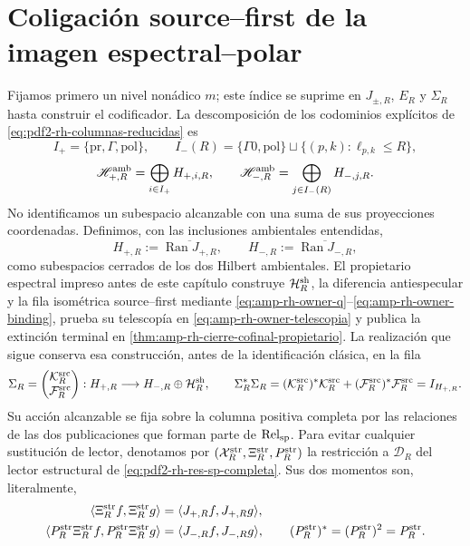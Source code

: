 \section{Coligación source--first de la imagen espectral--polar}

Fijamos primero un nivel nonádico \(m\); este índice se suprime en
\(J_{\pm,R}\), \(E_R\) y \(\Sigma_R\) hasta construir el codificador. La
descomposición de los codominios explícitos de
\eqref{eq:pdf2-rh-columnas-reducidas} es
\[
 I_+=\{\mathrm{pr},\Gamma,\mathrm{pol}\},\qquad
 I_-(R)=\{\Gamma0,\mathrm{pol}\}
 \sqcup\{(p,k):\ell_{p,k}\leq R\},
\]
\[
 \mathscr H_{+,R}^{\rm amb}=\bigoplus_{i\in I_+}H_{+,i,R},
 \qquad
 \mathscr H_{-,R}^{\rm amb}=\bigoplus_{j\in I_-(R)}H_{-,j,R}.
\]
No identificamos un subespacio alcanzable con una suma de sus proyecciones
coordenadas. Definimos, con las inclusiones ambientales entendidas,
\[
 H_{+,R}:=\overline{\operatorname{Ran}J_{+,R}},\qquad
 H_{-,R}:=\overline{\operatorname{Ran}J_{-,R}},
\]
como subespacios cerrados de los dos Hilbert ambientales. El propietario
espectral impreso antes de este capítulo construye
\(\mathcal H_R^{\rm sh}\), la diferencia antiespecular y la fila isométrica
source--first mediante
\eqref{eq:amp-rh-owner-q}--\eqref{eq:amp-rh-owner-binding}, prueba su
telescopía en \eqref{eq:amp-rh-owner-telescopia} y publica la extinción
terminal en \cref{thm:amp-rh-cierre-cofinal-propietario}. La realización
que sigue conserva esa construcción, antes de la identificación clásica,
en la fila
\begin{equation}\label{eq:pdf2-rh-coligacion-source-first}
 \Sigma_R=
 \begin{pmatrix}\mathcal K_R^{\rm src}\\ \mathcal F_R^{\rm src}\end{pmatrix}:
 H_{+,R}\longrightarrow
 H_{-,R}\oplus\mathcal H_R^{\rm sh},
 \qquad
 \Sigma_R^*\Sigma_R
 = (\mathcal K_R^{\rm src})^*\mathcal K_R^{\rm src}
  +(\mathcal F_R^{\rm src})^*\mathcal F_R^{\rm src}=I_{H_{+,R}}.
\end{equation}
Su acción alcanzable se fija sobre la columna positiva completa por
las relaciones de las dos publicaciones que forman parte de
\(\operatorname{Rel}_{\rm sp}\). Para evitar cualquier sustitución de lector,
denotamos por
\((\mathcal X_R^{\rm str},\Xi_R^{\rm str},P_R^{\rm str})\) la restricción a
\(\mathcal D_R\) del lector estructural de
\eqref{eq:pdf2-rh-res-sp-completa}. Sus dos momentos son, literalmente,
\begin{equation}\label{eq:pdf2-rh-momentos-lector-estructural}
\begin{aligned}
 \langle\Xi_R^{\rm str}f,\Xi_R^{\rm str}g\rangle
  &=\langle J_{+,R}f,J_{+,R}g\rangle,\\
 \langle P_R^{\rm str}\Xi_R^{\rm str}f,
          P_R^{\rm str}\Xi_R^{\rm str}g\rangle
  &=\langle J_{-,R}f,J_{-,R}g\rangle,
 \qquad (P_R^{\rm str})^*= (P_R^{\rm str})^2=P_R^{\rm str}.
\end{aligned}
\end{equation}
